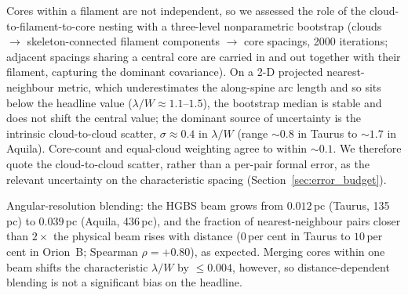 \documentclass[usenatbib,twoside,twocolumn]{mnras}
\begin{document}
Cores within a filament are not independent, so we assessed the role of the cloud-to-filament-to-core nesting with a three-level nonparametric bootstrap (clouds $\to$ skeleton-connected filament components $\to$ core spacings, 2000 iterations; adjacent spacings sharing a central core are carried in and out together with their filament, capturing the dominant covariance). On a 2-D projected nearest-neighbour metric, which underestimates the along-spine arc length and so sits below the headline value ($\lambda/W\approx1.1$--$1.5$), the bootstrap median is stable and does not shift the central value; the dominant source of uncertainty is the intrinsic cloud-to-cloud scatter, $\sigma\approx0.4$ in $\lambda/W$ (range $\sim0.8$ in Taurus to $\sim1.7$ in Aquila). Core-count and equal-cloud weighting agree to within $\sim0.1$. We therefore quote the cloud-to-cloud scatter, rather than a per-pair formal error, as the relevant uncertainty on the characteristic spacing (Section~\ref{sec:error_budget}).

Angular-resolution blending: the HGBS beam grows from $0.012$\,pc (Taurus, 135\,pc) to $0.039$\,pc (Aquila, 436\,pc), and the fraction of nearest-neighbour pairs closer than $2\times$ the physical beam rises with distance ($0$\,per cent in Taurus to $10$\,per cent in Orion~B; Spearman $\rho=+0.80$), as expected. Merging cores within one beam shifts the characteristic $\lambda/W$ by $\le0.004$, however, so distance-dependent blending is not a significant bias on the headline.
\end{document}
